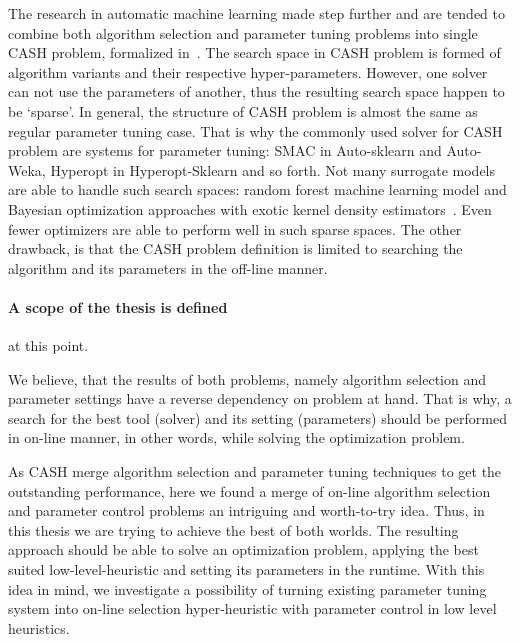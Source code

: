 The research in automatic machine learning made step further and are tended to combine both algorithm selection and parameter tuning problems into single CASH problem, formalized in~\cite{thornton2013auto}. The search space in CASH problem is formed of algorithm variants and their respective hyper-parameters. However, one solver can not use the parameters of another, thus the resulting search space happen to be `sparse'. In general, the structure of CASH problem is almost the same as regular parameter tuning case. That is why the commonly used solver for CASH problem are systems for parameter tuning: SMAC in Auto-sklearn and Auto-Weka, Hyperopt in Hyperopt-Sklearn and so forth.
Not many surrogate models are able to handle such search spaces: random forest machine learning model and Bayesian optimization approaches with exotic kernel density estimators~\cite{levesque2017bayesian}. Even fewer optimizers are able to perform well in such sparse spaces.
The other drawback, is that the CASH problem definition is limited to searching the algorithm and its parameters in the off-line manner.

\paragraph{A scope of the thesis is defined} at this point.

We believe, that the results of both problems, namely algorithm selection and parameter settings have a reverse dependency on problem at hand.
That is why, a search for the best tool (solver) and its setting (parameters) should be performed in on-line manner, in other words, while solving the optimization problem.

As CASH merge algorithm selection and parameter tuning techniques to get the outstanding performance, here we found a merge of on-line algorithm selection and parameter control problems an intriguing and worth-to-try idea. 
Thus, in this thesis we are trying to achieve the best of both worlds. The resulting approach should be able to solve an optimization problem, applying the best suited low-level-heuristic and setting its parameters in the runtime. With this idea in mind, we investigate a possibility of turning existing parameter tuning system into on-line selection hyper-heuristic with parameter control in low level heuristics.
